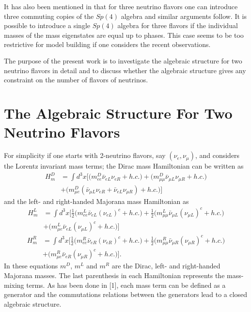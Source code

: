 \documentclass[a4paper,12pt]{article}
\begin{document}
It has also been mentioned in \cite{baha} that 
for three neutrino flavors one can introduce three commuting copies of the
$Sp(4)$ algebra and similar arguments follow. It is possible to
introduce a single $Sp(4)$ algebra for three flavors if the individual
masses of the mass eigenstates  are equal up to phases. This case
seems to be too restrictive for model building if one considers 
the recent observations.

The purpose of the present work is to investigate the algebraic structure 
for two neutrino flavors in detail and to  discuss whether the algebraic 
structure gives any constraint on the number of flavors of neutrinos.

\section{The Algebraic Structure For Two Neutrino Flavors}

For simplicity if one starts with 2-neutrino flavors, say $(\nu_e,\nu_\mu)$, 
and considers the Lorentz invariant mass terms; the Dirac mass 
Hamiltonian can be written as \cite{bilenky}
\begin{align}
H_{m}^{D} &= \int  d^{3}{x}\biggl[\bigl(m_{ee}^{D}\bar{\nu}_{eL}\nu_{eR}+h.c.
\bigr)+
\bigl(m_{\mu \mu}^{D}\bar{\nu}_{\mu L}\nu_{\mu R}+h.c.\bigr)\nonumber \\[0.1cm]
&+\bigl(m_{\mu e}^{D}(\bar{\nu}_{\mu L}\nu_{eR}+\bar{\nu}_{eL}\nu_{\mu R})
+h.c.\bigr) \biggr]
\end{align}
and the left- and right-handed Majorana mass Hamiltonian as \cite{bilenky}
\begin{align}
H_{m}^{L} &=\int  d^{3}{x}\biggl[\frac {1}{2}\bigl(m_{ee}^{L}\bar{\nu}_{eL}(\nu
_{eL})^{c}+h.c.\bigr)+\frac {1}{2}\bigl(m_{\mu \mu }^{L}\bar{\nu}_{\mu L}(\nu_{\mu
L})^{c}+h.c.\bigr)\nonumber\\[0.1cm]
&+\bigl(m_{\mu e}^{L}\bar{\nu}_{eL}(\nu_{\mu L})^{c}+h.c.\bigr)\biggr]
\end{align}
\begin{align}
H_{m}^{R} &=\int  d^{3}{x}\biggl[\frac {1}{2}\bigl(m_{ee}^{R}
\bar{\nu}_{eR}(\nu_{eR})^{c}+h.c.\bigr)+\frac {1}{2}
\bigl(m_{\mu \mu }^{R}\bar{\nu}_{\mu R}(\nu_{\mu
R})^{c}+h.c.\bigr)\nonumber\\[0.1cm]
&+\bigl(m_{\mu e}^{R}\bar{\nu}_{eR}(\nu_{\mu R})^{c}+h.c.\bigr)\biggr].
\end{align} 
In these equations $m^D$, $m^L$ and $m^R$ are the Dirac, left- and right-handed
Majorana masses. The last parenthesis in each Hamiltonian represents the mass-mixing terms. As has been done in [1], each mass term can be defined 
as a generator  and the commutations relations between the generators lead 
to a closed algebraic structure. 
\end{document}
